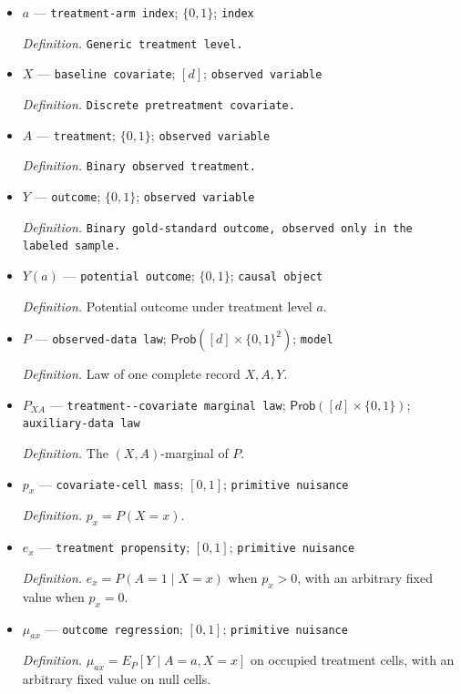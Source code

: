 \documentclass{article}
\begin{document}
\begin{itemize}
  \item \(a\) --- \texttt{treatment-\allowbreak{}arm index}; \(\{0,1\}\); \texttt{index}
  \par\smallskip\noindent\emph{Definition.} \texttt{Generic treatment level.}
  \item \(X\) --- \texttt{baseline covariate}; \([d]\); \texttt{observed variable}
  \par\smallskip\noindent\emph{Definition.} \texttt{Discrete pretreatment covariate.}
  \item \(A\) --- \texttt{treatment}; \(\{0,1\}\); \texttt{observed variable}
  \par\smallskip\noindent\emph{Definition.} \texttt{Binary observed treatment.}
  \item \(Y\) --- \texttt{outcome}; \(\{0,1\}\); \texttt{observed variable}
  \par\smallskip\noindent\emph{Definition.} \texttt{Binary gold-\allowbreak{}standard outcome,\allowbreak{} observed only in the labeled sample.}
  \item \(Y(a)\) --- \texttt{potential outcome}; \(\{0,1\}\); \texttt{causal object}
  \par\smallskip\noindent\emph{Definition.} Potential outcome under treatment level \(a\).
  \item \(P\) --- \texttt{observed-\allowbreak{}data law}; \(\mathsf{Prob}([d]\times\{0,1\}^2)\); \texttt{model}
  \par\smallskip\noindent\emph{Definition.} Law of one complete record \(X,A,Y\).
  \item \(P_{XA}\) --- \texttt{treatment-\allowbreak{}-\allowbreak{}covariate marginal law}; \(\mathsf{Prob}([d]\times\{0,1\})\); \texttt{auxiliary-\allowbreak{}data law}
  \par\smallskip\noindent\emph{Definition.} The \((X,A)\)-marginal of \(P\).
  \item \(p_x\) --- \texttt{covariate-\allowbreak{}cell mass}; \([0,1]\); \texttt{primitive nuisance}
  \par\smallskip\noindent\emph{Definition.} \(p_x=P(X=x)\).
  \item \(e_x\) --- \texttt{treatment propensity}; \([0,1]\); \texttt{primitive nuisance}
  \par\smallskip\noindent\emph{Definition.} \(e_x=P(A=1\mid X=x)\) when \(p_x>0\), with an arbitrary fixed value when \(p_x=0\).
  \item \(\mu_{ax}\) --- \texttt{outcome regression}; \([0,1]\); \texttt{primitive nuisance}
  \par\smallskip\noindent\emph{Definition.} \(\mu_{ax}=E_P[Y\mid A=a,X=x]\) on occupied treatment cells, with an arbitrary fixed value on null cells.

\end{itemize}
\end{document}
